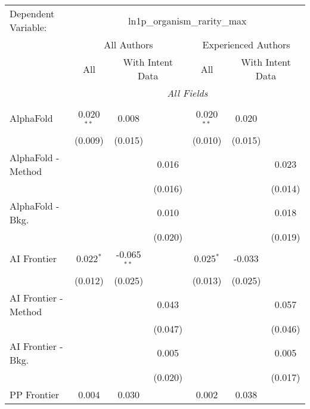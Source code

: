 \begingroup
\centering
\begin{tabular}{lcccccc}
   \tabularnewline \midrule \midrule
   Dependent Variable: & \multicolumn{6}{c}{ln1p\_organism\_rarity\_max}\\
 & \multicolumn{3}{c}{All Authors} & \multicolumn{3}{c}{Experienced Authors} \\
\cmidrule(lr){2-4} \cmidrule(lr){5-7}
 & \multicolumn{1}{c}{All} & \multicolumn{2}{c}{With Intent Data} & \multicolumn{1}{c}{All} & \multicolumn{2}{c}{With Intent Data} \\
\cmidrule(lr){2-2} \cmidrule(lr){3-4} \cmidrule(lr){5-5} \cmidrule(lr){6-7}
 & \multicolumn{6}{c}{\textit{All Fields}} \\ \\
   AlphaFold            & 0.020$^{**}$ & 0.008         &         & 0.020$^{**}$ & 0.020   &   \\   
                        & (0.009)      & (0.015)       &         & (0.010)      & (0.015) &   \\   
   AlphaFold - Method   &              &               & 0.016   &              &         & 0.023\\   
                        &              &               & (0.016) &              &         & (0.014)\\   
   AlphaFold - Bkg.     &              &               & 0.010   &              &         & 0.018\\   
                        &              &               & (0.020) &              &         & (0.019)\\   
   AI Frontier          & 0.022$^{*}$  & -0.065$^{**}$ &         & 0.025$^{*}$  & -0.033  &   \\   
                        & (0.012)      & (0.025)       &         & (0.013)      & (0.025) &   \\   
   AI Frontier - Method &              &               & 0.043   &              &         & 0.057\\   
                        &              &               & (0.047) &              &         & (0.046)\\   
   AI Frontier - Bkg.   &              &               & 0.005   &              &         & 0.005\\   
                        &              &               & (0.020) &              &         & (0.017)\\   
   PP Frontier          & 0.004        & 0.030         &         & 0.002        & 0.038   &   \\   

\end{tabular}

